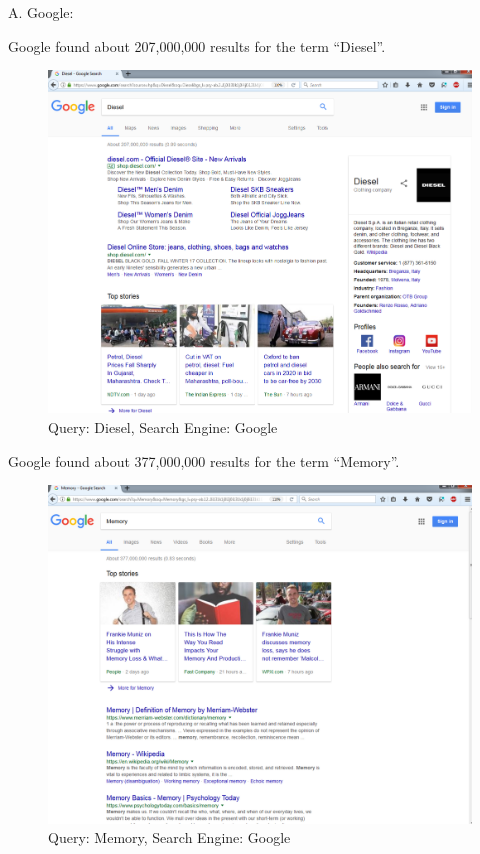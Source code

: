 \documentclass[a4paper, 11pt]{article}
\begin{document}
A. Google:

\pagebreak
Google found about 207,000,000 results for the term ``Diesel''.
\begin{figure}[h]
\caption{Query: Diesel, Search Engine: Google}
\centering
\includegraphics[scale=0.4]{Q1/DieselGoogle.png}
\end{figure}

\pagebreak
Google found about 377,000,000 results for the term ``Memory''.
\begin{figure}[h]
\caption{Query: Memory, Search Engine: Google}
\centering
\includegraphics[scale=0.4]{Q1/MemoryGoogle.png}
\end{figure}
\end{document}
